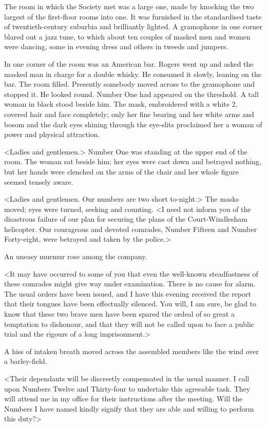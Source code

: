 The room in which the Society met was a large one, made by knocking the two largest of the first-floor rooms into one. It was furnished in the standardised taste of twentieth-century suburbia and brilliantly lighted. A gramophone in one corner blared out a jazz tune, to which about ten couples of masked men and women were dancing, some in evening dress and others in tweeds and jumpers.

In one corner of the room was an American bar. Rogers went up and asked the masked man in charge for a double whisky. He consumed it slowly, leaning on the bar. The room filled. Presently somebody moved across to the gramophone and stopped it. He looked round. Number One had appeared on the threshold. A tall woman in black stood beside him. The mask, embroidered with a white 2, covered hair and face completely; only her fine bearing and her white arms and bosom and the dark eyes shining through the eye-slits proclaimed her a woman of power and physical attraction.

<Ladies and gentlemen.> Number One was standing at the upper end of the room. The woman sat beside him; her eyes were cast down and betrayed nothing, but her hands were clenched on the arms of the chair and her whole figure seemed tensely aware.

<Ladies and gentlemen. Our numbers are two short to-night.> The masks moved; eyes were turned, seeking and counting. <I need not inform you of the disastrous failure of our plan for securing the plans of the Court-Windlesham helicopter. Our courageous and devoted comrades, Number Fifteen and Number Forty-eight, were betrayed and taken by the police.>

An uneasy murmur rose among the company.

<It may have occurred to some of you that even the well-known steadfastness of these comrades might give way under examination. There is no cause for alarm. The usual orders have been issued, and I have this evening received the report that their tongues have been effectually silenced. You will, I am sure, be glad to know that these two brave men have been spared the ordeal of so great a temptation to dishonour, and that they will not be called upon to face a public trial and the rigours of a long imprisonment.>

A hiss of intaken breath moved across the assembled members like the wind over a barley-field.

<Their dependants will be discreetly compensated in the usual manner. I call upon Numbers Twelve and Thirty-four to undertake this agreeable task. They will attend me in my office for their instructions after the meeting. Will the Numbers I have named kindly signify that they are able and willing to perform this duty?>

